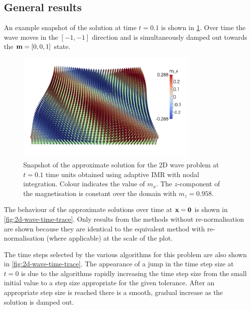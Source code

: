 \subsection{General results}

An example snapshot of the solution at time $t=0.1$ is shown in \cref{fig:2d-wave-snapshot}.
Over time the wave moves in the $[-1,-1]$ direction and is simultaneously damped out towards the $\boldsymbol{\mathrm{m}} = [0,0,1]$ state.

\begin{figure}
  \centering
  \includegraphics[width=0.8\textwidth]{images/2d_wave_picture_t0p1.pdf}
  \caption{Snapshot of the approximate solution for the 2D wave problem at $t=0.1$ time units obtained using adaptive IMR with nodal integration.
    Colour indicates the value of $m_x$.
    The $z$-component of the magnetisation is constant over the domain with $m_z = 0.958$.}
  \label{fig:2d-wave-snapshot}
\end{figure}

The behaviour of the approximate solutions over time at $\boldsymbol{\mathrm{x}} = \mathbf{0}$ is shown in \cref{fig:2d-wave-time-trace}.
Only results from the methods without re-normalisation are shown because they are identical to the equivalent method with re-normalisation (where applicable) at the scale of the plot.

The time steps selected by the various algorithms for this problem are also shown in \cref{fig:2d-wave-time-trace}.
The appearance of a jump in the time step size at $t=0$ is due to the algorithms rapidly increasing the time step size from the small initial value to a step size appropriate for the given tolerance.
After an appropriate step size is reached there is a smooth, gradual increase as the solution is damped out.

